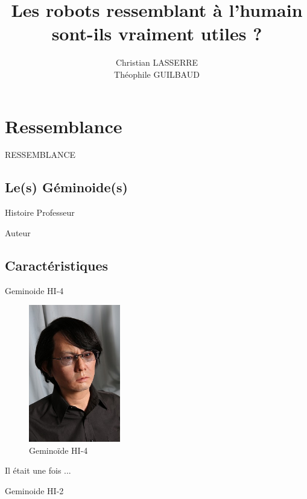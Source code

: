 \documentclass{beamer}
\title{Les robots ressemblant à l'humain sont-ils vraiment utiles ?}
\author{Christian LASSERRE\\ Théophile GUILBAUD}
\institute{ENSEIRB-MATMECA}
\date{}
\begin{document}
\begin{frame}
  \titlepage
\end{frame}

\begin{frame}
  \tableofcontents
\end{frame}

\section{Ressemblance}
\begin{frame}
  RESSEMBLANCE
\end{frame}

\subsection{Le(s) Géminoide(s)}
\begin{frame}{Histoire}
  Professeur
\end{frame}

\begin{frame}{Auteur}
\end{frame}

\subsection{Caractéristiques}
\begin{frame}{Geminoide HI-4}
  \begin{framed}
    \begin{figure}
      \centering
      \includegraphics[width=40mm]{data/HI-4}
      \caption{Geminoïde HI-4}
    \end{figure}
    Il était une fois ...
  \end{framed}
\end{frame}

\begin{frame}{Geminoide HI-2}
\end{frame}
\end{document}
